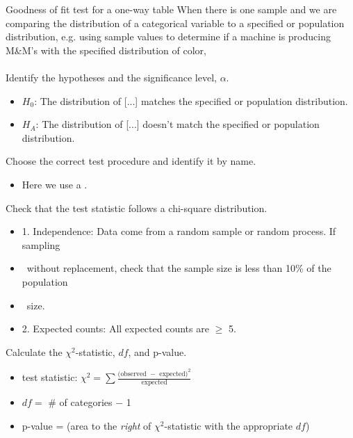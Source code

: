 \begin{onebox}{Goodness of fit test for a one-way table}
 When there is one sample and we are comparing the distribution of a categorical variable to a specified or population distribution, e.g. using sample values to determine if a machine is producing M\&M's with the specified distribution of color, 
\\
\\
 Identify the hypotheses and the significance level, $\alpha$. \vspace{-1mm}
\begin{itemize}
\setlength{\itemsep}{0mm}
\item[]  $H_0$: The distribution of [...] matches the specified or population distribution. 
\item[] $H_A$: The distribution of [...] doesn't match the specified or population distribution.
\end{itemize}
 Choose the correct test procedure and identify it by name.\vspace{-1mm}
\begin{itemize}
\item[]  Here we use a .
\end{itemize}
 Check that the test statistic follows a chi-square distribution.\vspace{-1mm}
\begin{itemize}
\setlength{\itemsep}{0mm}
\item[] 1.  Independence:  Data come from a random sample or random process.  If sampling 
\item[] \quad \  without replacement, check that the sample size is less than 10\% of the population
\item[] \quad \ size.
\item[] 2.   Expected counts:  All expected counts are $\ge$ 5. 
\end{itemize}
 Calculate the $\chi^2$-statistic, $df$, and p-value.\vspace{-1mm}  
\begin{itemize}
\setlength{\itemsep}{0mm}
\item[] test statistic:  $\chi^2 =\sum{ \frac{\text{(observed } - \text{ expected})^2}{\text{expected}}}$ 
\item[] $df =$ \# of categories $-$ 1
\item[] p-value = (area to the \emph{right} of $\chi^2$-statistic with the appropriate $df$)

\end{itemize}
\end{onebox}
